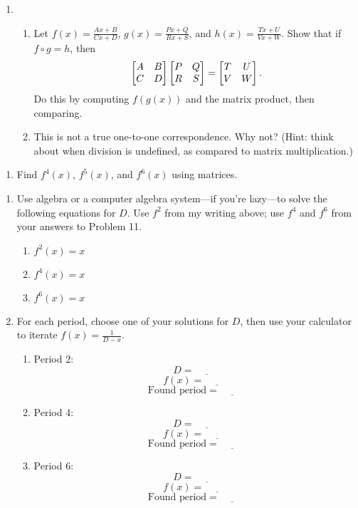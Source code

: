 \documentclass[../gatm_answers.tex]{subfiles}
\begin{document}
\begin{enumerate}
\setcounter{enumi}{\value{problem_i}}
\item \begin{enumerate}
\item Let $f(x)=\frac{Ax+B}{Cx+D}$, $g(x)=\frac{Px+Q}{Rx+S}$, and $h(x)=\frac{Tx+U}{Vx+W}$. Show that if $f\circ g = h$, then
$$\begin{bmatrix} A & B \\ C & D \end{bmatrix}\begin{bmatrix} P & Q \\ R & S \end{bmatrix}=\begin{bmatrix} T & U \\ V & W \end{bmatrix}.$$
Do this by computing $f(g(x))$ and the matrix product, then comparing.
\item This is not a true one-to-one correspondence. Why not? (Hint: think about when division is undefined, as compared to matrix multiplication.)
\end{enumerate}
\setcounter{problem_i}{\value{enumi}}
\end{enumerate}

\begin{enumerate}
\setcounter{enumi}{\value{problem_i}}
\item Find $f^4(x)$, $f^5(x)$, and $f^6(x)$ using matrices.
\setcounter{problem_i}{\value{enumi}}
\end{enumerate}

\begin{enumerate}
\setcounter{enumi}{\value{problem_i}}
\item Use algebra or a computer algebra system---if you're lazy---to solve the following equations for $D$. Use $f^2$ from my writing above; use $f^4$ and $f^6$ from your answers to Problem 11.
\begin{multicols}{3}
\begin{enumerate}
\item $f^2(x)=x$
\item $f^4(x)=x$
\item $f^6(x)=x$
\end{enumerate}
\end{multicols}
\item For each period, choose one of your solutions for $D$, then use your calculator to iterate $f(x)=\frac{1}{D-x}$.
\begin{multicols}{3}
\begin{enumerate}
\item Period 2: $$D=\underline{\phantom{00000}}$$ $$f(x)=\underline{\phantom{00000}}$$ $$\text{Found period}=\underline{\phantom{00000}}$$
\item Period 4: $$D=\underline{\phantom{00000}}$$ $$f(x)=\underline{\phantom{00000}}$$ $$\text{Found period}=\underline{\phantom{00000}}$$
\item Period 6: $$D=\underline{\phantom{00000}}$$ $$f(x)=\underline{\phantom{00000}}$$ $$\text{Found period}=\underline{\phantom{00000}}$$
\end{enumerate}
\end{multicols}
\setcounter{problem_i}{\value{enumi}}
\end{enumerate}
\end{document}
